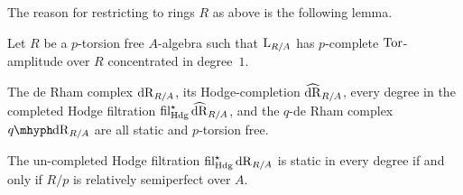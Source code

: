 \documentclass[DIV=12,numbers=enddot,leqno,bibliography=totoc]{scrartcl}
\begin{document}
	The reason for restricting to rings $R$ as above is the following lemma.
	\begin{lem}\label{lem:RelativelySemiperfect}
		Let $R$ be a $p$-torsion free $A$-algebra such that $\mathrm{L}_{R/A}$ has $p$-complete $\operatorname{Tor}$-amplitude over $R$ concentrated in degree~$1$.
		\begin{alphanumerate}
			\item The de Rham complex $\mathrm{dR}_{R/A}$, its Hodge-completion $\hatdeRham_{R/A}$, every degree in the completed Hodge filtration $\fil_{\Hodge}^\star\hatdeRham_{R/A}$, and the $q$-de Rham complex $\qdeRham_{R/A}$ are all static and $p$-torsion free.\label{enum:deRhamStatic}
			\item The un-completed Hodge filtration $\operatorname{fil}_{\mathrm{Hdg}}^\star\mathrm{dR}_{R/A}$ is static in every degree if and only if $R/p$ is relatively semiperfect over $A$.\label{enum:HodgeStatc}
		\end{alphanumerate}
	\end{lem}
\end{document}
